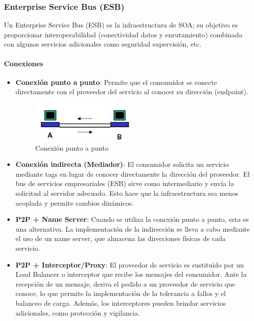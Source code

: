 \documentclass{article}
\begin{document}
		\subsubsection{Enterprise Service Bus (ESB)}
		Un Enterprise Service Bus (ESB) es la infraestructura de SOA; su objetivo es proporcionar interoperabilidad (conectividad datos y enrutamiento) combinada con  algunos servicios adicionales como seguridad supervisión, etc.
		
		\paragraph{Conexiones}
		\begin{itemize}		
			\item \textbf{Conexión punto a punto}: Permite que el consumidor se conecte directamente con el proveedor del servicio al conocer su dirección (endpoint).
			\begin{figure}[h]
				\centering
				\includegraphics[width=0.5\textwidth]{punto_punto.png}
				\caption{Conexión punto a punto}
			\end{figure}
			
			
			\item \textbf{Conexión indirecta (Mediador)}: El consumidor solicita un servicio mediante tags en lugar de conocer directamente la dirección del proveedor. El bus de servicios empresariales (ESB) sirve como intermediario y envía la solicitud al servidor adecuado. Esto hace que la infraestructura sea menos acoplada y permite cambios dinámicos. 
			
			\item \textbf{P2P + Name Server}: Cuando se utiliza la conexión punto a punto, esta es una alternativa. La implementación de la indirección se lleva a cabo mediante el uso de un name server, que almacena las direcciones físicas de cada servicio.
							
			
			\item \textbf{P2P + Interceptor/Proxy}: El proveedor de servicio es sustituido por un Load Balancer o interceptor que recibe los mensajes del consumidor. Ante la recepción de un mensaje, deriva el pedido a un proveedor de servicio que conoce, lo que permite la implementación de la tolerancia a fallos y el balanceo de carga. Además, los interceptores pueden brindar servicios adicionales, como protección y vigilancia.
		
			
		\end{itemize}
		
\end{document}
